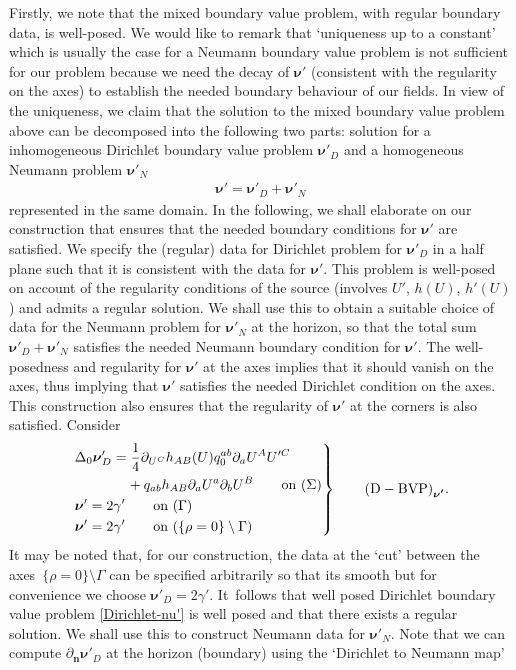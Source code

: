 \documentclass[pdftex]{sigma}
\def\ptl{\partial}%
\def\mbo#1{\boldsymbol{#1}}%
\numberwithin{equation}{section}
\begin{document}
Firstly, we note that the mixed boundary value problem, with regular boundary data, is well-posed. We would like to remark that `uniqueness up to a constant' which is usually the case for a Neumann boundary value problem is not sufficient for our problem because we need the decay of $\mbo{\nu}'$ (consistent with the regularity on the axes) to establish the needed boundary behaviour of our fields.
In view of the uniqueness, we claim that the solution to the mixed boundary value problem above can be decomposed into the following two parts: solution for a inhomogeneous Dirichlet boundary value problem $\mbo{\nu'}_D$ and a homogeneous Neumann problem $\mbo{\nu}'_N$
\begin{align*}
\mbo{\nu}' = \mbo{\nu}'_D + \mbo{\nu}'_N
\end{align*}
represented in the same domain. In the following, we shall elaborate on our construction that ensures that the needed boundary conditions for $\mbo{\nu}'$ are satisfied. We specify the (regular) data for Dirichlet problem for $\mbo{\nu}'_D$ in a half plane such that it is consistent with the data for $\mbo{\nu}'$. This problem is well-posed on account of the regularity conditions of the source (involves $U'$, $h(U)$, $h'(U)$) and admits a regular solution. We shall use this to obtain a suitable choice of data for the Neumann problem for $\mbo{\nu}'_N$ at the horizon, so that the total sum $\mbo{\nu}'_D + \mbo{\nu}'_N$ satisfies the needed Neumann boundary condition for $\mbo{\nu}'$. The well-posedness and regularity for $\mbo{\nu}'$ at the axes implies that it should vanish on the axes, thus implying that $\mbo{\nu}'$ satisfies the needed Dirichlet condition on the axes. This construction also ensures that the regularity of $\mbo{\nu}'$ at the corners is also satisfied. Consider
\begin{equation} \label{Dirichlet-nu'}
\left.\begin{aligned}
&\Delta_0 \mbo{\nu}_D'=\frac{1}{4} \ptl_{U^C} h_{AB}(U) q^{ab}_{0} \ptl_a U^A U'^C\\
& \hphantom{\Delta_0 \mbo{\nu}_D'=}{} + q_{ab} h_{AB} \ptl_a U^a \ptl_b U^B \qquad \text{on}\ (\Sigma)\\
&\mbo{\nu}'=2 \gamma' \qquad \text{on} \ (\Gamma) \\
&\mbo{\nu}'=2 \gamma' \qquad \text{on} \ (\{ \rho=0\} \setminus \Gamma)
\end{aligned}
 \right\}
\qquad {\rm (D-BVP)}_{\mbo{\nu'}}.
\end{equation}
It may be noted that, for our construction, the data at the `cut' between the axes~${\{ \rho =0\} \setminus \Gamma}$ can be specified arbitrarily so that its smooth but for convenience we choose $ \mbo{\nu}'_D = 2 \gamma'$. It~follows that well posed Dirichlet boundary value problem \eqref{Dirichlet-nu'} is well posed and that there exists a regular solution. We shall use this to construct Neumann data for $\mbo{\nu}'_N$. Note that we can compute $\ptl_{\mbo{n}} \mbo{\nu}'_D$ at the horizon (boundary) using the `Dirichlet to Neumann map'
\end{document}

